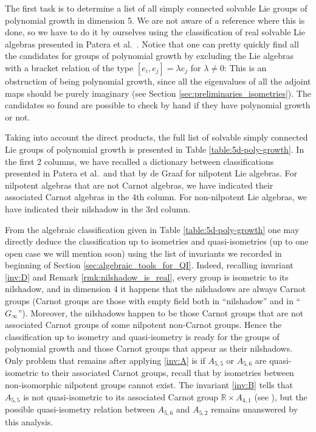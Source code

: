 \documentclass[a4paper,12pt]{amsart}
\theoremstyle{plain}
\theoremstyle{definition}
\theoremstyle{plain}
\theoremstyle{remark}
\newcommand{\laina}[1]{``#1''}
\begin{document}
The first task is to determine a list of all simply connected solvable Lie groups of polynomial growth in dimension 5. We are not aware of a reference where this is done, so we have to do it by ourselves using the classification of real solvable Lie algebras presented in Patera et al.\ \cite[p. 989]{avain:Patera}. Notice that one can pretty quickly find all the candidates for groups of polynomial growth by excluding the Lie algebras with a bracket relation of the type \( [e_i,e_j] = \lambda e_j \) for \( \lambda \neq 0 \): This is an obstruction of being polynomial growth, since all the eigenvalues of all the adjoint maps should be purely imaginary (see Section \ref{sec:preliminaries_isometries}). The candidates so found are possible to check by hand if they have polynomial growth or not.


Taking into account the direct products, the full list of solvable simply connected Lie groups of polynomial growth is presented in Table \ref{table:5d-poly-growth}. In the first 2 columns, we have recalled a dictionary between classifications presented in Patera et al.\ and that by de Graaf \cite{deGraaf-2007-dim_6_nilpotent_lie_algebras} for nilpotent Lie algebras. For nilpotent algebras that are not Carnot algebras, we have indicated their associated Carnot algebras in the 4th column. For non-nilpotent Lie algebras, we have indicated their nilshadow in the 3rd column.

From the algebraic classification given in Table \ref{table:5d-poly-growth} one may directly deduce the classification up to isometries and quasi-isometries (up to one open case we will mention soon) using the list of invariants we recorded in beginning of Section \ref{sec:algebraic_tools_for_QI}. Indeed, recalling invariant \ref{inv:D} and Remark \ref{rmk:nilshadow_is_real}, every group is isometric to its nilshadow, and in dimension 4 it happens that the nilshadows are always Carnot groups (Carnot groups are those with empty field both in \laina{nilshadow} and in \laina{\(G_\infty\)}). Moreover, the nilshadows happen to be those Carnot groups that are not associated Carnot groups of some nilpotent non-Carnot groups. Hence the classification up to isometry and quasi-isometry is ready for the groups of polynomial growth and those Carnot groups that appear as their nilshadows. Only problem that remains after applying \ref{inv:A} is if \( A_{5,5} \) or \( A_{5,6} \) are quasi-isometric to their associated Carnot groups, recall that by \cite{avain:Wol63} isometries between non-isomorphic nilpotent groups cannot exist. The invariant \ref{inv:B} tells that \( A_{5,5} \) is not quasi-isometric to its associated Carnot group \( \mathbb{R} \times A_{4,1} \) (see \cite[Section 19.7]{Cornulier:qihlc}), but the possible quasi-isometry relation between \( A_{5,6} \) and \( A_{5,2} \) remains unanswered by this analysis.%
\end{document}
